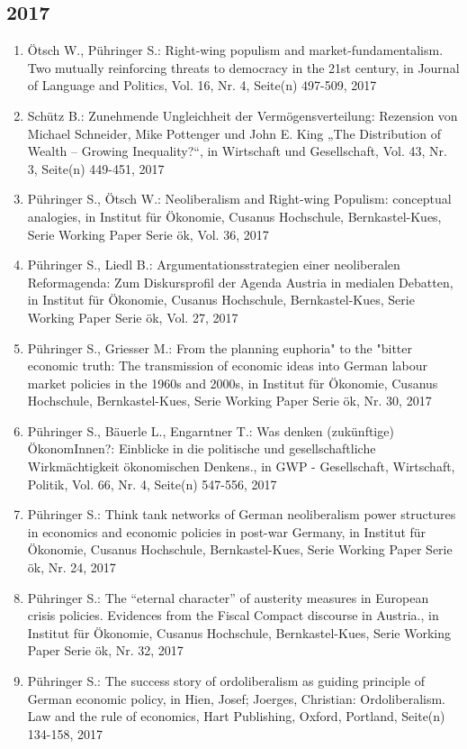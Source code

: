 \subsection*{2017}
\begin{enumerate}
    	 \item Ötsch W., Pühringer S.: Right-wing populism and market-fundamentalism. Two mutually reinforcing threats to democracy in the 21st century, in Journal of Language and Politics, Vol. 16, Nr. 4, Seite(n) 497-509, 2017
	 \item Schütz B.: Zunehmende Ungleichheit der Vermögensverteilung: Rezension von Michael Schneider, Mike Pottenger und John E. King „The Distribution of Wealth – Growing Inequality?“, in Wirtschaft und Gesellschaft, Vol. 43, Nr. 3, Seite(n) 449-451, 2017
	 \item Pühringer S., Ötsch W.: Neoliberalism and Right-wing Populism: conceptual analogies, in Institut für Ökonomie, Cusanus Hochschule, Bernkastel-Kues, Serie Working Paper Serie ök, Vol. 36, 2017
	 \item Pühringer S., Liedl B.: Argumentationsstrategien einer neoliberalen Reformagenda: Zum Diskursprofil der Agenda Austria in medialen Debatten, in Institut für Ökonomie, Cusanus Hochschule, Bernkastel-Kues, Serie Working Paper Serie ök, Vol. 27, 2017
	 \item Pühringer S., Griesser M.: From the \glqq planning euphoria" to the "bitter economic truth\grqq{}: The transmission of economic ideas into German labour market policies in the 1960s and 2000s, in Institut für Ökonomie, Cusanus Hochschule, Bernkastel-Kues, Serie Working Paper Serie ök, Nr. 30, 2017
	 \item Pühringer S., Bäuerle L., Engarntner T.: Was denken (zukünftige) ÖkonomInnen?: Einblicke in die politische und gesellschaftliche Wirkmächtigkeit ökonomischen Denkens., in GWP - Gesellschaft, Wirtschaft, Politik, Vol. 66, Nr. 4, Seite(n) 547-556, 2017
	 \item Pühringer S.: Think tank networks of German neoliberalism power structures in economics and economic policies in post-war Germany, in Institut für Ökonomie, Cusanus Hochschule, Bernkastel-Kues, Serie Working Paper Serie ök, Nr. 24, 2017
	 \item Pühringer S.: The “eternal character” of austerity measures in European crisis policies. Evidences from the Fiscal Compact discourse in Austria., in Institut für Ökonomie, Cusanus Hochschule, Bernkastel-Kues, Serie Working Paper Serie ök, Nr. 32, 2017
	 \item Pühringer S.: The success story of ordoliberalism as guiding principle of German economic policy, in Hien, Josef; Joerges, Christian: Ordoliberalism. Law and the rule of economics, Hart Publishing, Oxford, Portland, Seite(n) 134-158, 2017

\end{enumerate}
